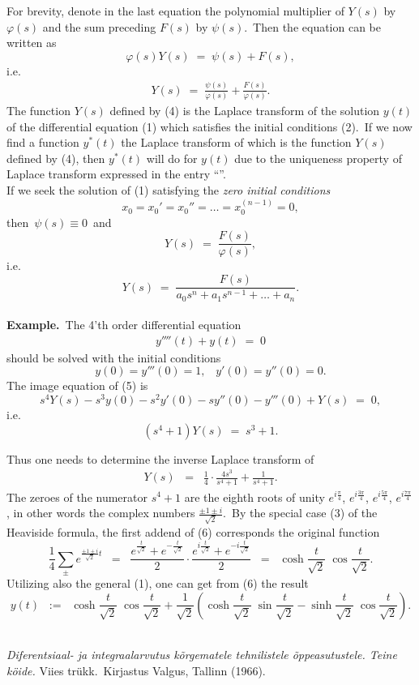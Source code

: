 \documentclass[12pt]{article}
\begin{document}
For brevity, denote in the last equation the polynomial 
multiplier of $Y(s)$ by $\varphi(s)$ and the sum preceding $F(s)$ 
by $\psi(s)$.\, Then the equation can be written as
$$\varphi(s)Y(s) \;=\; \psi(s)+F(s),$$
i.e.
\begin{align}
Y(s) \;=\; \frac{\psi(s)}{\varphi(s)}+\frac{F(s)}{\varphi(s)}.
\end{align}
The function $Y(s)$ defined by (4) is the Laplace transform of 
the solution $y(t)$ of the differential equation (1) which 
satisfies the initial conditions (2).\, If we now find a function 
$y^*(t)$ the Laplace transform of which is the function $Y(s)$ 
defined by (4), then $y^*(t)$ will do for $y(t)$ due to the 
uniqueness property of Laplace transform expressed in the entry 
``''.\\
If we seek the solution of (1) satisfying the {\it zero initial 
conditions}
$$x_0 = x_0' = x_0'' = \ldots = x_0^{(n-1)} = 0,$$
then\, $\psi(s) \equiv 0$\, and
$$Y(s) \;=\; \frac{F(s)}{\varphi(s)},$$
i.e.
$$Y(s) \;=\; \frac{F(s)}{a_0s^n+a_1s^{n-1}+\ldots+a_n}.$$\\

\textbf{Example.}\, The 4'th order differential equation
\begin{align}
y''''(t)+y(t) \;=\; 0
\end{align}
should be solved with the initial conditions
$$y(0) = y'''(0) = 1, \;\;\; y'(0) = y''(0) = 0.$$
The image equation of (5) is
$$s^4Y(s)-s^3y(0)-s^2y'(0)-sy''(0)-y'''(0)+Y(s) \;=\; 0,$$
i.e.
$$(s^4\!+\!1)Y(s) \;=\; s^3\!+\!1.$$


Thus one needs to determine the inverse Laplace transform of
\begin{align}
Y(s) \;\;=\;\; \frac{1}{4}\!\cdot\!\frac{4s^3}{s^4+1}+\frac{1}{s^4+1}.
\end{align}
The zeroes of the numerator $s^4\!+\!1$ are the eighth roots of unity 
$e^{i\frac{\pi}{4}}$, $e^{i\frac{3\pi}{4}}$, $e^{i\frac{5\pi}{4}}$, 
$e^{i\frac{7\pi}{4}}$, in other words the complex numbers
$\frac{\pm 1\pm i}{\sqrt{2}}$.\, By the special case (3) of 
the Heaviside formula, the first addend of (6) 
corresponds the original function
$$\frac{1}{4}\sum_\pm e^{\frac{\pm 1\pm i}{\sqrt{2}}t} \;\;=\;\;
\frac{e^{\frac{t}{\sqrt{2}}}+e^{-\frac{t}{\sqrt{2}}}}{2}
\cdot
\frac{e^{i\frac{t}{\sqrt{2}}}+e^{-i\frac{t}{\sqrt{2}}}}{2}
\;\;=\;\;
\cosh\frac{t}{\sqrt{2}}\;\cos\frac{t}{\sqrt{2}}.$$
Utilizing also the general 
 (1), one can 
get from (6) the result
$$y(t) \;\;:=\;\; 
\cosh{\frac{t}{\sqrt{2}}}\;\cos{\frac{t}{\sqrt{2}}}+
\frac{1}{\sqrt{2}}(\cosh{\frac{t}{\sqrt{2}}}\;\sin{\frac{t}{\sqrt{2}}}
-\sinh{\frac{t}{\sqrt{2}}}\;\cos{\frac{t}{\sqrt{2}}}).$$\\




\begin{thebibliography}{9}
 {\em Diferentsiaal- ja 
integraalarvutus k\~{o}rgematele tehnilistele 
\~{o}ppeasutustele. Teine k\"{o}ide.} Viies tr\"{u}kk.\, 
Kirjastus Valgus, Tallinn  (1966).
\end{thebibliography}\\
\end{document}
